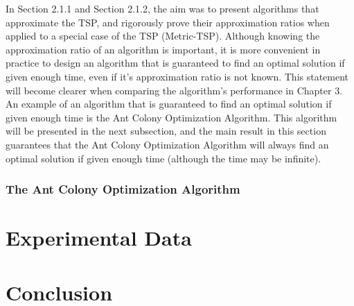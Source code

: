 \documentclass{article}
\begin{document}
In Section 2.1.1 and Section 2.1.2, the aim was to present algorithms that approximate the TSP, and rigorously prove their approximation ratios when applied to a special case of the TSP (Metric-TSP). Although knowing the approximation ratio of an algorithm is important, it is more convenient in practice to design an algorithm that is guaranteed to find an optimal solution if given enough time, even if it's approximation ratio is not known. This statement will become clearer when comparing the algorithm's performance in Chapter 3. An example of an algorithm that is guaranteed to find an optimal solution if given enough time is the Ant Colony Optimization Algorithm. This algorithm will be presented in the next subsection, and the main result in this section guarantees that the Ant Colony Optimization Algorithm will always find an optimal solution if given enough time (although the time may be infinite). 
\subsubsection{The Ant Colony Optimization Algorithm}
\newpage
\section{Experimental Data}
\newpage
\section{Conclusion}
\newpage

\nocite{*}

\end{document}
